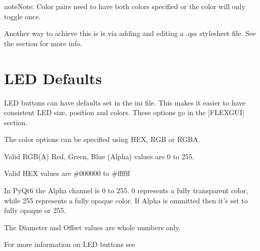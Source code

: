 \documentclass[letterpaper,10pt,english]{sphinxmanual}
\begin{document}
\begin{sphinxadmonition}{note}{Note:}
\sphinxAtStartPar
Color pairs need to have both colors specified or the color will only
toggle once.
\end{sphinxadmonition}

\sphinxAtStartPar
Another way to achieve this is is via adding and editing a .qss stylesheet
file. See the {\hyperref[\detokenize{style::doc}]{}} section for more info.


\section{LED Defaults}
\label{\detokenize{ini:led-defaults}}\label{\detokenize{ini:id1}}
\sphinxAtStartPar
LED buttons can have defaults set in the ini file. This makes it easier to have
consistent LED size, position and colors. These options go in the {[}FLEXGUI{]}
section.

\sphinxAtStartPar
The color options can be specified using HEX, RGB or RGBA.

\sphinxAtStartPar
Valid RGB(A) Red, Green, Blue (Alpha) values are 0 to 255.

\sphinxAtStartPar
Valid HEX values are \#000000 to \#ffffff

\sphinxAtStartPar
In PyQt6 the Alpha channel is 0 to 255. 0 represents a fully transparent color,
while 255 represents a fully opaque color. If Alpha is ommitted then it’s set to
fully opaque or 255.

\sphinxAtStartPar
The Diameter and Offset values are whole numbers only.

\begin{sphinxVerbatim}[commandchars=\\\{\}]
\PYG{p}{[}\PYG{p}{]}
  
  
  
    
    
\end{sphinxVerbatim}

\sphinxAtStartPar
For more information on LED buttons see {\hyperref[\detokenize{controls:led-buttons}]{}}
\end{document}
